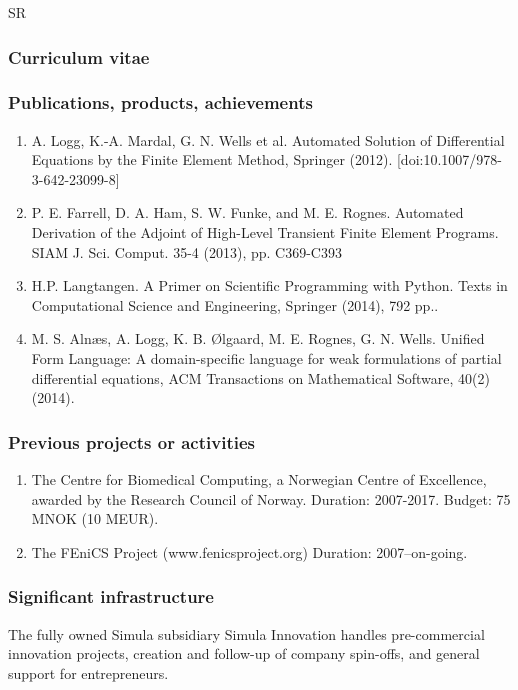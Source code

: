 \begin{sitedescription}{SR}
\subsubsection*{Curriculum vitae}




%

\subsubsection*{Publications, products, achievements}

\begin{enumerate}
\item  A. Logg, K.-A. Mardal, G. N. Wells et al. Automated Solution of Differential Equations by the Finite Element Method, Springer (2012). [doi:10.1007/978-3-642-23099-8]
\item P. E. Farrell, D. A. Ham, S. W. Funke, and M. E. Rognes.	Automated Derivation of the Adjoint of High-Level Transient Finite Element Programs. SIAM J. Sci. Comput. 35-4 (2013), pp. C369-C393
\item H.P. Langtangen. A Primer on Scientific Programming with Python. Texts in Computational Science and Engineering, Springer (2014), 792 pp..
\item M. S. Aln\ae s, A. Logg, K. B. \O lgaard, M. E. Rognes, G. N. Wells. Unified Form Language: A domain-specific language for weak formulations of partial differential equations, ACM Transactions on Mathematical Software, 40(2) (2014).
\end{enumerate}

\subsubsection*{Previous projects or activities}

\begin{enumerate}
\item The Centre for Biomedical Computing, a Norwegian Centre of Excellence, awarded by the Research Council of Norway. Duration: 2007-2017. Budget: 75 MNOK (10 MEUR). 
\item The FEniCS Project (www.fenicsproject.org) Duration: 2007--on-going. 
\end{enumerate}

\subsubsection*{Significant infrastructure}

The fully owned Simula subsidiary Simula Innovation handles pre-commercial innovation projects, creation and follow-up of company spin-offs, and general support for entrepreneurs.
\end{sitedescription}






